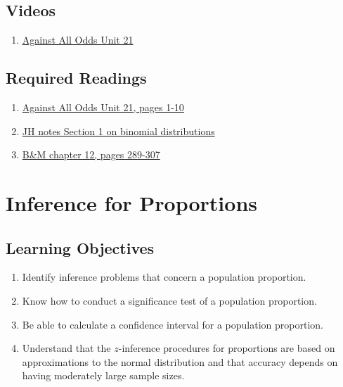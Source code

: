 \documentclass[letterpaper,9pt,twocolumn,twoside,printwatermark=false]{pinp}
\providecommand{\tightlist}{%
  \setlength{\itemsep}{0pt}\setlength{\parskip}{0pt}}
\begin{document}
\subsection{Videos}\label{videos}

\begin{enumerate}
\def\labelenumi{\arabic{enumi}.}
\tightlist
\item
  \href{https://www.learner.org/courses/againstallodds/unitpages/unit21.html}{Against
  All Odds Unit 21}
\end{enumerate}

\subsection{Required Readings}\label{required-readings}

\begin{enumerate}
\item \href{https://www.learner.org/courses/againstallodds/pdfs/AgainstAllOdds_StudentGuide_Unit21.pdf#page=1}{Against All Odds Unit 21, pages 1-10}
\item \href{https://www.dropbox.com/s/g1ui3xg8nup1p6b/proportion-model-inference-plan-2018.pdf?dl=0}{JH notes Section 1 on binomial distributions}
\item \href{https://www.dropbox.com/s/gse9zpx4v5f3lhb/Ch12DescreteDistributions.pdf?dl=0}{B\&M chapter 12, pages 289-307}
\end{enumerate}

\vspace*{0.25cm}

\section{Inference for Proportions}\label{inference-for-proportions}

\subsection{Learning Objectives}\label{learning-objectives-1}

\begin{enumerate}
\def\labelenumi{\arabic{enumi}.}
\tightlist
\item
  Identify inference problems that concern a population proportion.
\item
  Know how to conduct a significance test of a population proportion.
\item
  Be able to calculate a confidence interval for a population
  proportion.
\item
  Understand that the \(z\)-inference procedures for proportions are
  based on approximations to the normal distribution and that accuracy
  depends on having moderately large sample sizes.
\end{enumerate}
\end{document}
